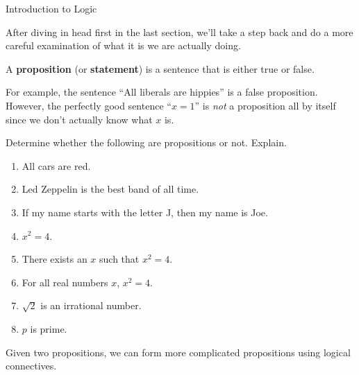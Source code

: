 \begin{section}{Introduction to Logic}

After diving in head first in the last section, we'll take a step back and do a more careful examination of what it is we are actually doing.

\begin{definition}
A \textbf{proposition} (or \textbf{statement}) is a sentence that is either true or false.
\end{definition}

For example, the sentence ``All liberals are hippies'' is a false proposition.  However, the perfectly good sentence ``$x=1$'' is \emph{not} a proposition all by itself since we don't actually know what $x$ is.

\begin{exercise} Determine whether the following are propositions or not. Explain.
\begin{enumerate}[label=\textrm{(\alph*)}]
\item All cars are red.
\item Led Zeppelin is the best band of all time. 
\item If my name starts with the letter J, then my name is Joe.
\item $x^2=4$.
\item There exists an $x$ such that $x^2=4$.
\item For all real numbers $x$, $x^2=4$.
\item $\sqrt{2}$ is an irrational number.
\item $p$ is prime.
\end{enumerate}
\end{exercise}

Given two propositions, we can form more complicated propositions using logical connectives.


\end{section}
